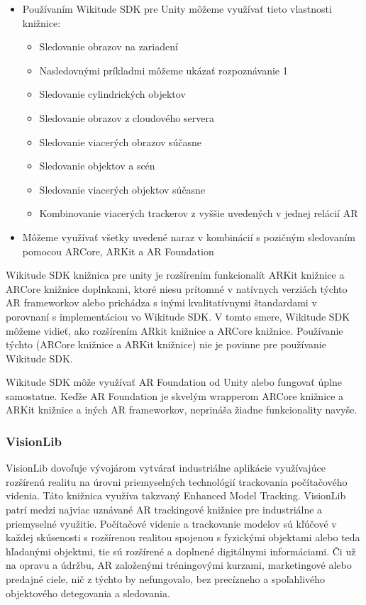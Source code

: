 \begin{itemize}
    \item Používaním Wikitude SDK pre Unity môžeme využívať tieto vlastnosti knižnice:
    \begin{itemize}
        \item Sledovanie obrazov na zariadení
        \item Nasledovnými príkladmi môžeme ukázať rozpoznávanie 1
        \item Sledovanie cylindrických objektov
        \item Sledovanie obrazov z cloudového servera
        \item Sledovanie viacerých obrazov súčasne
        \item Sledovanie objektov a scén
        \item Sledovanie viacerých objektov súčasne
        \item Kombinovanie viacerých trackerov z vyššie uvedených v jednej relácií AR
    \end{itemize}
    \item Môžeme využívať všetky uvedené naraz v kombinácií s pozičným sledovaním pomocou ARCore, ARKit a AR Foundation
\end{itemize}

Wikitude SDK knižnica pre unity je rozšírením funkcionalít ARKit knižnice a ARCore knižnice doplnkami, ktoré niesu prítomné v natívnych verziách týchto AR frameworkov alebo prichádza s inými kvalitatívnymi štandardami v porovnaní s implementáciou vo Wikitude SDK. V tomto smere, Wikitude SDK môžeme vidieť, ako rozšírením ARkit knižnice a ARCore knižnice. Používanie týchto (ARCore knižnice a ARKit knižnice) nie je povinne pre používanie Wikitude SDK.

Wikitude SDK môže využívať AR Foundation od Unity alebo fungovať úplne samostatne. Keďže AR Foundation je skvelým wrapperom ARCore knižnice a ARKit knižnice a iných AR frameworkov, neprináša žiadne funkcionality navyše. \cite{wikitude2023sdk}

\subsubsection{VisionLib}

VisionLib dovoľuje vývojárom vytvárať industriálne aplikácie využívajúce rozšírenú realitu na úrovni priemyselných technológií trackovania počítačového videnia. Táto knižnica využíva takzvaný Enhanced Model Tracking. VisionLib patrí medzi najviac uznávané AR trackingové knižnice pre industriálne a priemyselné využitie. Počítačové videnie a trackovanie modelov sú kľúčové v každej skúsenosti s rozšírenou realitou spojenou s fyzickými objektami alebo teda hľadanými objektmi, tie sú rozšírené a doplnené digitálnymi informáciami. Či už na opravu a údržbu, AR založenými tréningovými kurzami, marketingové alebo predajné ciele, nič z týchto by nefungovalo, bez precízneho a spoľahlivého objektového detegovania a sledovania.

